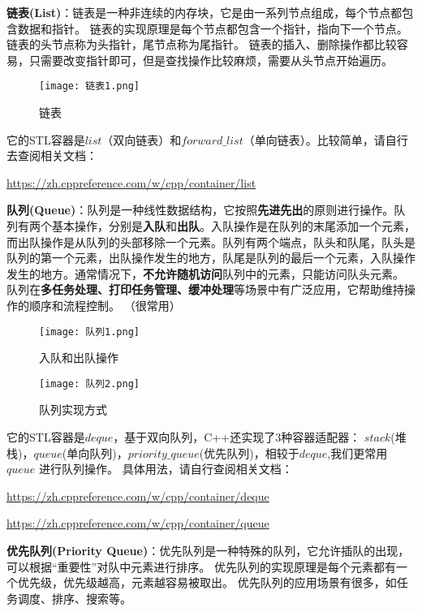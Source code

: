 \textbf{链表(List)}：链表是一种非连续的内存块，它是由一系列节点组成，每个节点都包含数据和指针。
链表的实现原理是每个节点都包含一个指针，指向下一个节点。链表的头节点称为头指针，尾节点称为尾指针。
链表的插入、删除操作都比较容易，只需要改变指针即可，但是查找操作比较麻烦，需要从头节点开始遍历。
\begin{figure}[H]
    \centering
    \texttt{[image: 链表1.png]}
    \caption{链表} %
    \label{fig:链表} %
\end{figure}

它的STL容器是$list$（双向链表）和$forward\_list$（单向链表）。比较简单，请自行去查阅相关文档：

\url{https://zh.cppreference.com/w/cpp/container/list}

\textbf{队列(Queue)}：队列是一种线性数据结构，它按照\textbf{先进先出}的原则进行操作。队列有两个基本操作，分别是\textbf{入队}和\textbf{出队}。入队操作是在队列的末尾添加一个元素，而出队操作是从队列的头部移除一个元素。队列有两个端点，队头和队尾，队头是队列的第一个元素，出队操作发生的地方，队尾是队列的最后一个元素，入队操作发生的地方。通常情况下，\textbf{不允许随机访问}队列中的元素，只能访问队头元素。
队列在\textbf{多任务处理、打印任务管理、缓冲处理}等场景中有广泛应用，它帮助维持操作的顺序和流程控制。
（很常用）
\begin{figure}[H]
    \centering
    \texttt{[image: 队列1.png]}
    \caption{入队和出队操作} %
    \label{fig:入队和出队操作} %
\end{figure}
\begin{figure}[H]
    \centering
    \texttt{[image: 队列2.png]}
    \caption{队列实现方式} %
    \label{fig:队列实现方式} %
\end{figure}

它的STL容器是$deque$，基于双向队列，C++还实现了3种容器适配器：
$stack$(堆栈)，$queue$(单向队列)，$priority\_queue$(优先队列)，相较于$deque$,我们更常用$queue$
进行队列操作。
具体用法，请自行查阅相关文档：

\url{https://zh.cppreference.com/w/cpp/container/deque}

\url{https://zh.cppreference.com/w/cpp/container/queue}

\textbf{优先队列(Priority Queue)}：优先队列是一种特殊的队列，它允许插队的出现，可以根据“重要性”对队中元素进行排序。
优先队列的实现原理是每个元素都有一个优先级，优先级越高，元素越容易被取出。
优先队列的应用场景有很多，如任务调度、排序、搜索等。

